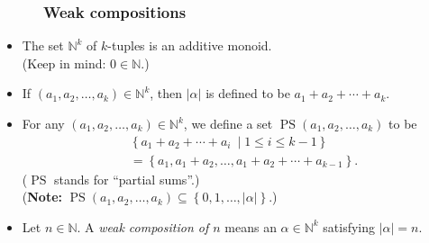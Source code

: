 \documentclass{beamer}
\newcommand{\NN}{{\mathbb N}}
\newcommand{\PS}{\operatorname{PS}}
\newcommand{\fti}[1]{\frametitle{\ \ \ \ \ #1}}
\newcommand{\set}[1]{\left\{ #1 \right\}}
\newcommand{\abs}[1]{\left| #1 \right|}
\newcommand{\tup}[1]{\left( #1 \right)}
\newcommand{\defn}[1]{{\color{darkred}\emph{#1}}} %
\theoremstyle{plain}
\begin{document}
\begin{frame}
\fti{Weak compositions}

\begin{itemize}

\item The set $\NN^k$ of $k$-tuples is an additive monoid. \\
      (Keep in mind: $0 \in \NN$.)

\item If $\tup{a_1, a_2, \ldots, a_k} \in \NN^k$, then
      \defn{$\abs{\alpha}$} is defined to be
      $a_1 + a_2 + \cdots + a_k$.

\pause

\item For any $\tup{a_1, a_2, \ldots, a_k} \in \NN^k$, we
      define a set
      \defn{$\PS \tup{a_1, a_2, \ldots, a_k}$} to be
      \begin{align*}
      & \set{a_1 + a_2 + \cdots + a_i \ \mid  1 \leq i \leq k-1 } \\
      & = \set{a_1, a_1 + a_2, \ldots, a_1 + a_2 + \cdots + a_{k-1}} .
      \end{align*}
      ($\PS$ stands for ``partial sums''.)
      \pause \\
      (\textbf{Note:}
      $\PS \tup{a_1, a_2, \ldots, a_k}
      \subseteq \set{0, 1, \ldots, \abs{\alpha}}$.)

\pause

\item Let $n \in \NN$.
      A \defn{weak composition of $n$} means an
      $\alpha \in \NN^k$ satisfying $\abs{\alpha} = n$.

\end{itemize}

\end{frame}
\end{document}
